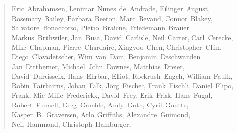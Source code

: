 \begin{quote}
\flushleft\small
Eric~Abrahamsen,        %
Lenimar~Nunes~de~Andrade, %
Eilinger~August,        %
Rosemary~Bailey,        %
Barbara~Beeton,         %
Marc~Bevand,            %
Connor~Blakey,          %
Salvatore~Bonaccorso,   %
Pietro~Braione,         %
Friedemann~Brauer,      %
Markus~Br\"uhwiler,     %
Jan~Busa,               %
David~Carlisle,         %
Neil~Carter,            %
Carl~Cerecke,           %
Mike~Chapman,           %
Pierre~Chardaire,       %
Xingyou~Chen,           %
Christopher~Chin,       %
Diego~Clavadetscher,    %
Wim~van~Dam,            %
Benjamin~Deschwanden    %
Jan~Dittberner,         %
Michael~John~Downes,    %
Matthias~Dreier,        %
David~Dureisseix,       %
Hans~Ehrbar,            %
Elliot,                 %
Rockrush~Engch,         %
William~Faulk,          %
Robin~Fairbairns,       %
Johan~Falk,             %
J\"org~Fischer,         %
Frank~Fischli,          %
Daniel~Flipo,           %
Frank,                  %
Mic~Milic~Frederickx,   %
David~Frey,             %
Erik~Frisk,             %
Hans~Fugal,             %
Robert~Funnell,         %
Greg~Gamble,            %
Andy~Goth,              %
Cyril~Goutte,           %
Kasper~B.~Graversen,    %
Arlo~Griffiths,         %
Alexandre~Guimond,      %
Neil~Hammond,           %
Christoph~Hamburger,    %

\end{quote}
